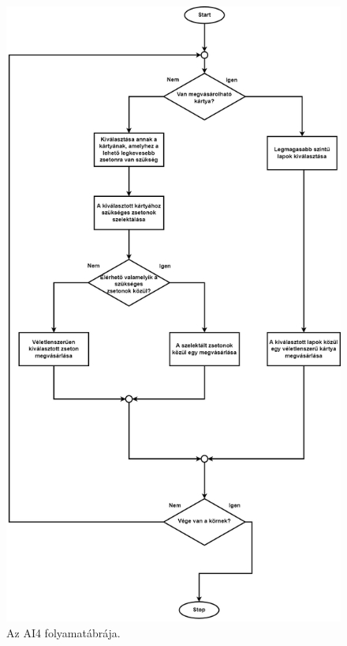 \begin{figure}[h]
\centering
\includegraphics[scale=0.35]{images/fourthAI_flowchart.png}
\caption{Az AI4 folyamatábrája.}
\label{fig:AI4_flowchart}
\end{figure}

